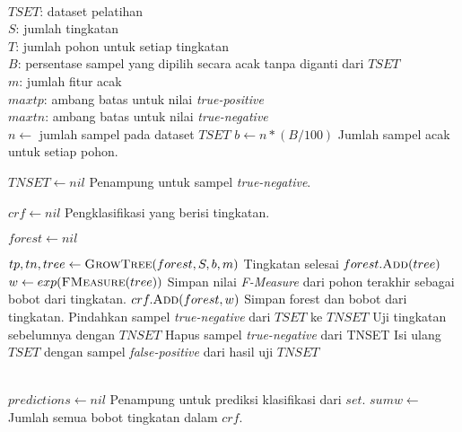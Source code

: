 \begin{center}
	\label{alg:crf}
	\begin{algorithmic}[1]
\Require \\
$ TSET $: dataset pelatihan \\
$ S $: jumlah tingkatan \\
$ T $: jumlah pohon untuk setiap tingkatan \\
$ B $: persentase sampel yang dipilih secara acak tanpa diganti dari $TSET$ \\
$ m $: jumlah fitur acak \\
$ maxtp $: ambang batas untuk nilai \textit{true-positive} \\
$ maxtn $: ambang batas untuk nilai \textit{true-negative}
\\
	\State $ n \gets $ jumlah sampel pada dataset $ TSET $
	\State $ b \gets n * (B / 100) $
	\Comment Jumlah sampel acak untuk setiap pohon.

	\State $ TNSET \gets nil $
	\Comment Penampung untuk sampel \textit{true-negative}.

	\State $ crf \gets nil $
	\Comment Pengklasifikasi yang berisi tingkatan.

		\State $ forest \gets nil $

			\State $ tp, tn, tree \gets \Call{GrowTree}{forest, S, b, m} $
				\State Tingkatan selesai
			\Else
				\State $ forest.\Call{Add}{tree} $
			\EndIf
		\EndFor
		\\
		\State $w \gets exp(\Call{FMeasure}{tree}) $
		\Comment Simpan nilai \textit{F-Measure} dari pohon terakhir sebagai
		bobot dari tingkatan.
		\State $ crf.\Call{Add}{forest, w} $
		\Comment Simpan forest dan bobot dari tingkatan.
			\State Pindahkan sampel \textit{true-negative} dari
			$TSET$ ke $TNSET$
		\Else
			\State Uji tingkatan sebelumnya dengan $TNSET$
			\State Hapus sampel \textit{true-negative} dari TNSET
			\State Isi ulang $TSET$ dengan sampel
			\textit{false-positive} dari hasil uji $TNSET$
		\EndIf
	\EndFor

	\State {}
\EndFunction
\\
	\State $ predictions \gets nil $
	\Comment Penampung untuk prediksi klasifikasi dari $set$.
	\State $ sumw \gets $ Jumlah semua bobot tingkatan dalam $crf$.


\end{algorithmic}
\end{center}
